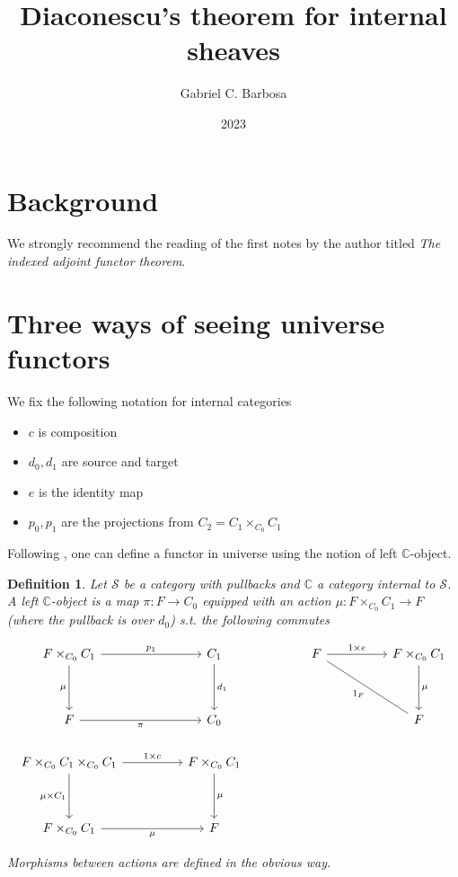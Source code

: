 \documentclass[10pt, oneside]{article}
\title{Diaconescu's theorem for internal sheaves}
\author{Gabriel C. Barbosa}
\date{2023}
\newtheorem{definition}[theorem]{Definition}
\begin{document}
\maketitle

\tableofcontents

\vspace{.25in}

\section{Background}

We strongly recommend the reading of the first notes by the author titled \textit{The indexed adjoint functor theorem}.

\section{Three ways of seeing universe functors}

We fix the following notation for internal categories

\begin{itemize}
    \item $c$ is composition
    \item $d_0, d_1$ are source and target
    \item $e$ is the identity map
    \item $p_0, p_1$ are the projections from $C_2 = C_1 \times_{C_0} C_1$
\end{itemize}

Following \cite{MacLane1994}, one can define a functor in universe using the notion of left $\mathbb{C}$-object.

\begin{definition}
    Let $\mathcal{S}$ be a category with pullbacks and $\mathbb{C}$ a category internal to $\mathcal{S}$. A left $\mathbb{C}$-object is a map $\pi: F \to C_0$ equipped with an action $\mu: F \times_{C_0} C_1 \to F$ (where the pullback is over $d_0$) s.t. the following commutes

    \[\begin{tikzcd}[ampersand replacement=\&]
	{F \times_{C_0} C_1} \&\& {C_1} \&\& F \&\& {F \times_{C_0} C_1} \\
	\\
	F \&\& {C_0} \&\&\&\& F \\
	{F \times_{C_0} C_1 \times_{C_0} C_1} \&\& {F \times_{C_0} C_1} \\
	\\
	{F \times_{C_0} C_1} \&\& F
	\arrow["{p_1}", from=1-1, to=1-3]
	\arrow["\mu"', from=1-1, to=3-1]
	\arrow["\pi"', from=3-1, to=3-3]
	\arrow["{d_1}", from=1-3, to=3-3]
	\arrow["{1 \times e}", from=1-5, to=1-7]
	\arrow["{1_F}"', no head, from=1-5, to=3-7]
	\arrow["\mu", from=1-7, to=3-7]
	\arrow["{1 \times c}", from=4-1, to=4-3]
	\arrow["{\mu \times C_1}"', from=4-1, to=6-1]
	\arrow["\mu", from=4-3, to=6-3]
	\arrow["\mu"', from=6-1, to=6-3]
\end{tikzcd}\]

Morphisms between actions are defined in the obvious way.
\end{definition}
\end{document}
